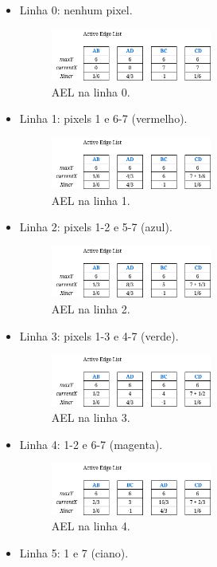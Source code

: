 \documentclass[12pt]{article}
\begin{document}
\begin{itemize}
    \item Linha 0: nenhum pixel.
\begin{figure}[H]
    \centering
    \includegraphics[width=0.5\textwidth]{images/3/3b_ael0.png}
    \caption*{AEL na linha 0.}
\end{figure}
    \item Linha 1: pixels 1 e 6-7 (vermelho).

\begin{figure}[H]
    \centering
    \includegraphics[width=0.5\textwidth]{images/3/3b_ael1.png}
    \caption*{AEL na linha 1.}
\end{figure}
    \item Linha 2: pixels 1-2 e 5-7 (azul).

\begin{figure}[H]
    \centering
    \includegraphics[width=0.5\textwidth]{images/3/3b_ael2.png}
    \caption*{AEL na linha 2.}
\end{figure}
    \item Linha 3: pixels 1-3 e 4-7 (verde).

\begin{figure}[H]
    \centering
    \includegraphics[width=0.5\textwidth]{images/3/3b_ael3.png}
    \caption*{AEL na linha 3.}
\end{figure}
    \item Linha 4: 1-2 e 6-7 (magenta).

\begin{figure}[H]
    \centering
    \includegraphics[width=0.5\textwidth]{images/3/3b_ael4.png}
    \caption*{AEL na linha 4.}
\end{figure}
    \item Linha 5: 1 e 7 (ciano).


\end{itemize}
\end{document}
